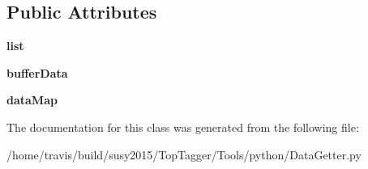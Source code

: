 \subsection*{Public Attributes}
\begin{DoxyCompactItemize}
\item 
\hypertarget{classDataGetter_1_1DataGetter_a2739938ac344ad65b1d2e25e2c787419}{{\bfseries list}}\label{classDataGetter_1_1DataGetter_a2739938ac344ad65b1d2e25e2c787419}

\item 
\hypertarget{classDataGetter_1_1DataGetter_a9d4f5ce1a7aae31b19aa9171cb0b62ac}{{\bfseries buffer\-Data}}\label{classDataGetter_1_1DataGetter_a9d4f5ce1a7aae31b19aa9171cb0b62ac}

\item 
\hypertarget{classDataGetter_1_1DataGetter_ad47a039976844990578f9b9d5e2301c3}{{\bfseries data\-Map}}\label{classDataGetter_1_1DataGetter_ad47a039976844990578f9b9d5e2301c3}

\end{DoxyCompactItemize}


The documentation for this class was generated from the following file\-:\begin{DoxyCompactItemize}
\item 
/home/travis/build/susy2015/\-Top\-Tagger/\-Tools/python/Data\-Getter.\-py\end{DoxyCompactItemize}
